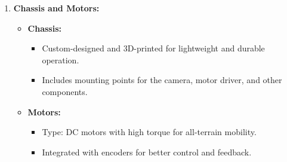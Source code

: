 \documentclass[12pt,a4paper]{report}
\begin{document}
\begin{enumerate}
\begin{itemize}
    \end{itemize}

    \item \textbf{Chassis and Motors:}
    \begin{itemize}
        \item \textbf{Chassis:}
        \begin{itemize}
            \item Custom-designed and 3D-printed for lightweight and durable operation.
            \item Includes mounting points for the camera, motor driver, and other components.
        \end{itemize}
        \item \textbf{Motors:}
        \begin{itemize}
            \item Type: DC motors with high torque for all-terrain mobility.
            \item Integrated with encoders for better control and feedback.
        \end{itemize}
        

\end{itemize}
\end{enumerate}
\end{document}
